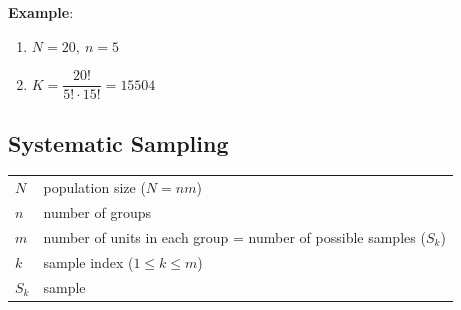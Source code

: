 \vspace{0.5cm}
\textbf{Example}:
\begin{enumerate}[itemsep=0.3cm]
    \item[] $N = 20,\ n = 5$

    \item[] $K = \dfrac{20!}{5!\cdot 15!}=15504$

    
\end{enumerate}





\subsection{Systematic Sampling \cite{statistics/book/Statistics-for-Data-Scientists/Maurits-Kaptein}}\label{Sampling Plans/Representative Sampling/Systematic Sampling}

\begin{table}[H]
    \centering
    \begin{tabular}{l l}
        $N$ & population size ($N=nm$)\\
        $n$ & number of groups \\
        $m$ & number of units in each group = number of possible samples ($S_k$)\\
        $k$ & sample index ($1 \leq k \leq m$) \\
        $S_k$ & sample\\
    \end{tabular}
\end{table}

